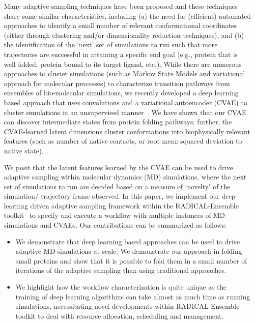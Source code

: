 \documentclass[conference,final]{IEEEtran}
\begin{document}
Many adaptive sampling techniques have been proposed and these techniques share some similar characteristics, including (a) the need for (efficient) automated approaches to identify a small number of relevant conformational coordinates (either through clustering and/or dimensionality reduction techniques), and (b) the identification of the ‘next’ set of simulations to run such that more trajectories are successful in attaining a specific end goal (e.g., protein that is well folded, protein bound to its target ligand, etc.). While there are numerous approaches to cluster simulations (such as Markov State Models and variational approach for molecular processes) to characterize transition pathways from ensembles of bio-molecular simulations, we recently developed a deep learning based approach that uses convolutions and a variational autoencoder (CVAE) to cluster simulations in an unsupervised manner~\cite{bhowmik2018deep}. We have shown that our CVAE can discover intermediate states from protein folding pathways; further, the CVAE-learned latent dimensions cluster conformations into biophysically relevant features (such as number of native contacts, or root mean squared deviation to native state). 

We posit that the latent features learned by the CVAE can be used to drive adaptive sampling within molecular dynamics (MD) simulations, where the next set of simulations to run are decided based on a measure of ‘novelty’ of the simulation/ trajectory frame observed. In this paper, we implement our deep learning driven adaptive sampling framework within the RADICAL-Ensemble toolkit~\cite{balasubramanian2018harnessing} to specify and execute a workflow with multiple instances of MD simulations and CVAEs. Our contributions can be summarized as follows: 
\begin{itemize}
\item We demonstrate that deep learning based approaches can be used to drive adaptive MD simulations at scale. We demonstrate our approach in folding small proteins and show that it is possible to fold them in a small number of iterations of the adaptive sampling than using traditional approaches. 
\item We highlight how the workflow characterization is quite unique as the training of deep learning algorithms can take almost as much time as running simulations, necessitating novel developments within RADICAL-Ensemble toolkit to deal with resource allocation, scheduling and management. 
\end{itemize}
\end{document}
